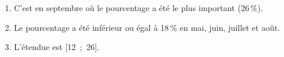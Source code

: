 
\medskip

\begin{enumerate}
\item C'est en septembre où le pourcentage a été le plus important (26\,\%).
\item Le pourcentage a été inférieur ou égal à 18\,\% en mai, juin, juillet et août.
\item L'étendue est [12~;~26].
\end{enumerate}

\bigskip

